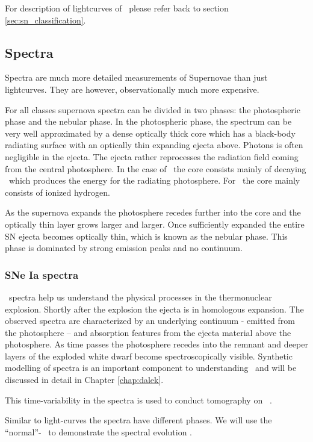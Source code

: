 For description of lightcurves of \sneii\ please refer back to section \ref{sec:sn_classification}.


\subsection{Spectra} 
\label{sec:intro_sn_spectra}
Spectra are much more detailed measurements of Supernovae than just lightcurves. They are however, observationally much more expensive. 

For all classes supernova spectra can be divided in two phases: the photospheric phase and the nebular phase.
In the photospheric phase, the spectrum can be very well approximated by a dense optically thick core which has a black-body radiating surface with an optically thin expanding ejecta above. Photons is often negligible in the ejecta. The ejecta rather reprocesses the radiation field coming from the central photosphere. 
In the case of \sneia\ the core consists mainly of decaying \Ni\ which produces the energy for the radiating photosphere. For \sneii\ the core mainly consists of ionized hydrogen.

As the supernova expands the photosphere recedes further into the core and the optically thin layer grows larger and larger. Once sufficiently expanded the entire SN ejecta becomes optically thin, which is known as the nebular phase. This phase is dominated by strong emission peaks and no continuum. 


\subsubsection{SNe Ia spectra}
\label{sec:intro_sneia_spectra}
\sneia\ spectra help us understand the physical processes in the thermonuclear explosion. 
Shortly after the explosion the ejecta is in homologous expansion.
The observed spectra are characterized by an underlying continuum - emitted from the photosphere -- and absorption features from the ejecta material above the photosphere. 
As time passes the photosphere recedes into the remnant and deeper layers of the exploded white dwarf become spectroscopically visible. Synthetic modelling of spectra is an important component to understanding \sneia\ and will be discussed in detail in Chapter \ref{chap:dalek}.

This time-variability in the spectra is used to conduct tomography on \sneia\ \citep{2005MNRAS.360.1231S, 2009MNRAS.399.1238H}.

Similar to light-curves the spectra have different phases. We will use the ``normal''-\snia\  to demonstrate the spectral evolution \citep{2011MNRAS.410.1725T}. 

